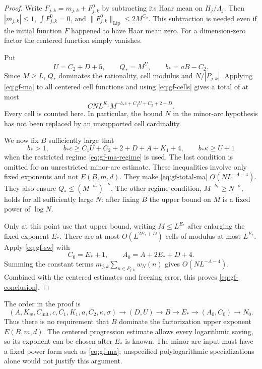 \begin{proof}
Write $F_{j,k}=m_{j,k}+F_{j,k}^0$ by subtracting its Haar mean on
$H_j/\Lambda_j$. Then $|m_{j,k}|\leq1$,
$\int F_{j,k}^0=0$, and
$\|F_{j,k}^0\|_{\mathrm{Lip}}\leq2M^{C_2}$. This subtraction is needed
even if the initial function $F$ happened to have Haar mean zero.
For a dimension-zero factor the centered function simply vanishes.

Put
\[
 U=C_2+D+5,\qquad Q_*=M^U,\qquad b_*=aB-C_2.
\]
Since $M\geq L$, $Q_*$ dominates the rationality, cell modulus and
$N/|P_{j,k}|$. Applying \eqref{eq:gf-ma} to all centered cell functions
and using \eqref{eq:gf-cells} gives a total of at most
\begin{equation}\label{eq:gf-total-ma}
 C N L^{K_1}M^{-b_*c+C_1U+C_2+2+D}.
\end{equation}
Every cell is counted here. In particular, the bound $N$ in the
minor-arc hypothesis has not been replaced by an unsupported cell
cardinality.

We now fix $B$ sufficiently large that
\begin{equation}\label{eq:gf-choice-B}
 b_*>1,\qquad
 b_*c\geq C_1U+C_2+2+D+A+K_1+4,
 \qquad b_*\kappa\geq U+1
\end{equation}
when the restricted regime \eqref{eq:gf-ma-regime} is used. The last
condition is omitted for an unrestricted minor-arc estimate. These
inequalities involve only fixed exponents and not $E(B,m,d)$.
They make \eqref{eq:gf-total-ma} $O(NL^{-A-4})$. They also ensure
$Q_*\leq(M^{-b_*})^{-\kappa}$. The other regime condition,
$M^{-b_*}\geq N^{-\sigma}$, holds for all sufficiently large $N$:
after fixing $B$ the upper bound on $M$ is a fixed power of $\log N$.

Only at this point use that upper bound, writing $M\leq L^{E_*}$ after
enlarging the fixed exponent $E_*$. There are at most
$O(L^{2E_*+D})$ cells of modulus at most $L^{E_*}$. Apply
\eqref{eq:gf-sw} with
\[
 C_0=E_*+1,\qquad A_0=A+2E_*+D+4.
\]
Summing the constant terms $m_{j,k}\sum_{n\in P_{j,k}}w_N(n)$ gives
$O(NL^{-A-4})$. Combined with the centered estimates and freezing error,
this proves \eqref{eq:gf-conclusion}.
\end{proof}

\begin{remark}\label{rem:gf-order}
The order in the proof is
\[
 (A,K_w,C_{\mathrm{init}},c,C_1,K_1,a,C_2,\kappa,\sigma)
 \longrightarrow (D,U)\longrightarrow B\longrightarrow E_*
 \longrightarrow(A_0,C_0)\longrightarrow N_0.
\]
Thus there is no requirement that $B$ dominate the factorization upper
exponent $E(B,m,d)$. The centered progression estimate allows every
logarithmic saving, so its exponent can be chosen after $E_*$ is known.
The minor-arc input must have a fixed power form such as
\eqref{eq:gf-ma}; unspecified polylogarithmic specializations alone
would not justify this argument.
\end{remark}


